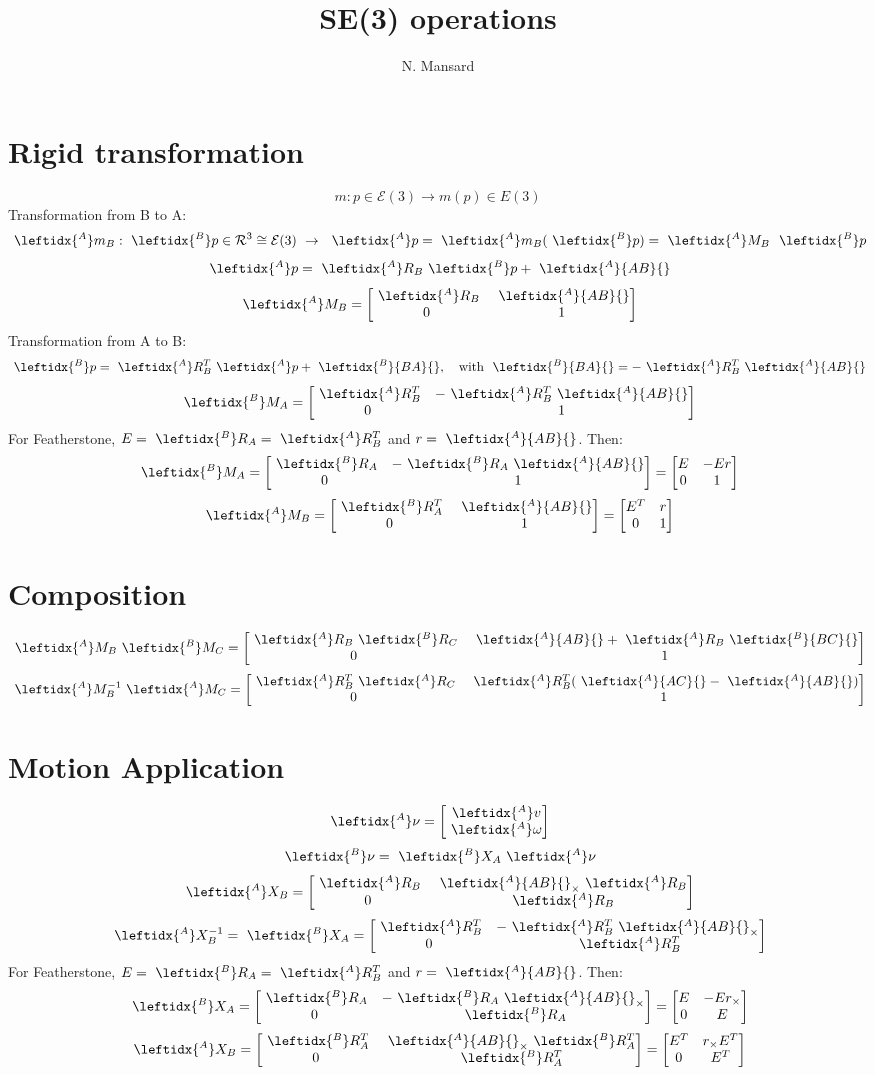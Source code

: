 \documentclass[11pt,twoside,a4paper]{article}
\newcommand{\BIN}{\begin{bmatrix}}
\newcommand{\BOUT}{\end{bmatrix}}
\newcommand{\calR}{\mathcal{R}}
\newcommand{\calE}{\mathcal{E}}
\newcommand{\repr}{\cong}
\newcommand{\aRb}{\ \leftidx{^A}R_B}
\newcommand{\aMb}{\ \leftidx{^A}M_B}
\newcommand{\amb}{\ \leftidx{^A}m_B}
\newcommand{\apb}{{\ \leftidx{^A}{AB}{}}}
\newcommand{\aXb}{\ \leftidx{^A}X_B}
\newcommand{\bRa}{\ \leftidx{^B}R_A}
\newcommand{\bMa}{\ \leftidx{^B}M_A}
\newcommand{\bpa}{\ \leftidx{^B}{BA}{}}
\newcommand{\bXa}{\ \leftidx{^B}X_A}
\newcommand{\ap}{\ \leftidx{^A}p}
\newcommand{\bp}{\ \leftidx{^B}p}
\newcommand{\avs}{\ \leftidx{^A}\nu}
\newcommand{\bvs}{\ \leftidx{^B}\nu}
\newcommand{\w}{\omega}
\newcommand{\av}{\ \leftidx{^A}v}
\newcommand{\aw}{\ \leftidx{^A}\w}
\newcommand{\aMc}{\ \leftidx{^A}M_C}
\newcommand{\aRc}{\ \leftidx{^A}R_C}
\newcommand{\apc}{\ \leftidx{^A}{AC}{}}
\newcommand{\bRc}{\ \leftidx{^B}R_C}
\newcommand{\bMc}{\ \leftidx{^B}M_C}
\newcommand{\bpc}{\ \leftidx{^B}{BC}{}}
\begin{document}
\title{SE(3) operations}
\author{N. Mansard}
\date{}
\maketitle

\section{Rigid transformation}
$$m : p \in \calE(3) \rightarrow m(p) \in E(3)$$
Transformation from B to A:
$$\amb : \bp \in \calR^3 \repr \calE(3) \ \rightarrow\ \ap = \amb(\bp) = \aMb\ \bp$$
$$ \ap = \aRb \bp +  \apb$$
$$\aMb = \BIN \aRb & \apb \\ 0 & 1 \BOUT $$
Transformation from A to B:
$$\bp = \aRb^T \ap + \bpa, \quad\textrm{with }\bpa = - \aRb^T \apb$$
$$\bMa = \BIN \aRb^T & - \aRb^T \apb \\ 0 & 1 \BOUT $$
For Featherstone, $E = \bRa =\aRb^T$ and $r = \apb$. Then:
$$\bMa = \BIN \bRa & -\bRa \apb \\ 0 & 1 \BOUT = \BIN E & -E r \\ 0 & 1 \BOUT $$
$$\aMb = \BIN \bRa^T & \apb \\ 0 & 1 \BOUT = \BIN E^T & r \\ 0 & 1 \BOUT $$

\section{Composition}
$$ \aMb \bMc = \BIN \aRb \bRc & \apb +  \aRb \bpc \\ 0 & 1 \BOUT $$
$$ \aMb^{-1} \aMc = \BIN \aRb^T \aRc & \aRb^T (\apc - \apb) \\ 0 & 1 \BOUT $$



\section{Motion Application}
$$\avs = \BIN \av \\ \aw \BOUT$$
$$\bvs = \bXa\avs$$
$$ \aXb =  \BIN \aRb & \apb_\times \aRb \\ 0 & \aRb \BOUT $$
$$ \aXb^{-1} = \bXa =  \BIN \aRb^T & -\aRb^T \apb_\times \\ 0 & \aRb^T \BOUT $$
For Featherstone, $E = \bRa =\aRb^T$ and $r = \apb$. Then:
$$ \bXa = \BIN \bRa & - \bRa \apb_\times \\ 0 & \bRa \BOUT = \BIN E & -E r_\times \\ 0 & E \BOUT$$
$$ \aXb = \BIN \bRa^T & \apb_\times \bRa^T \\ 0 & \bRa^T \BOUT = \BIN E^T & r_\times E^T \\ 0 & E^T \BOUT$$ 
\end{document}
